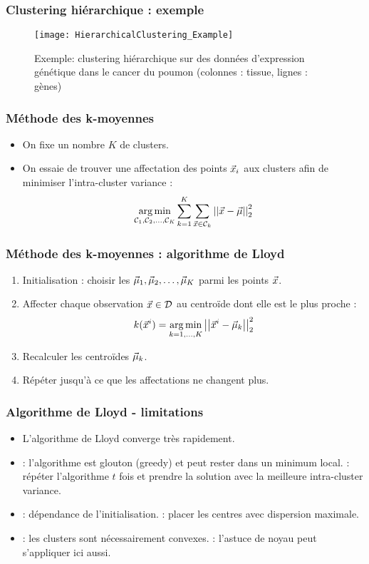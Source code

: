 \begin{frame}
\frametitle{Clustering hiérarchique : exemple}
\begin{figure}[htb]
  \centering
  \texttt{[image: HierarchicalClustering\_Example]}
  \caption{Exemple: clustering hiérarchique sur des données d'expression génétique dans le cancer du poumon (colonnes : tissue, lignes : gènes)}
\end{figure}
\end{frame}



\begin{frame}
\frametitle{Méthode des k-moyennes}
\begin{itemize}
	\item On fixe un nombre $K$ de clusters. 
	\item On essaie de trouver une affectation des points $\vec{x}_i$ aux clusters afin de minimiser l'intra-cluster variance : 
	\begin{equation*}
	\operatorname*{arg\,min}_{\mathcal{C}_1, \mathcal{C}_2, \ldots, \mathcal{C}_K} \sum_{k=1}^K \sum_{\vec{x} \in \mathcal{C}_k} \left|\left|\vec{x} - \vec{\mu}\right|\right|_2^2
	\end{equation*}
\end{itemize}
\end{frame}

\begin{frame}
\frametitle{Méthode des k-moyennes : algorithme de Lloyd}
\begin{enumerate}
	\item Initialisation : choisir les $\vec{\mu}_1, \vec{\mu}_2, \ldots, \vec{\mu}_K$ parmi les points $\vec{x}$. 
	\item Affecter chaque observation $\vec{x} \in \mathcal{D}$ au centroïde dont elle est le plus proche :
	\begin{equation*}
		k(\vec{x}^i) = \operatorname*{arg\,min}_{k=1, \ldots, K}\left|\left|\vec{x}^i - \vec{\mu}_k\right|\right|_2^2
	\end{equation*}
	\item Recalculer les centroïdes $\vec{\mu}_k$. 
	\item Répéter jusqu'à ce que les affectations ne changent plus. 
\end{enumerate}
\end{frame}

\begin{frame}
\frametitle{Algorithme de Lloyd - limitations}
\begin{itemize}
\item L'algorithme de Lloyd converge très rapidement. 
\item {} : l'algorithme est glouton (greedy) et peut rester dans un minimum local.  : répéter l'algorithme $t$ fois et prendre la solution avec la meilleure intra-cluster variance. 
\item {} : dépendance de l'initialisation.  : placer les centres avec dispersion maximale.
\item {} : les clusters sont nécessairement convexes.  : l'astuce de noyau peut s'appliquer ici aussi. 
\end{itemize}
\end{frame}

